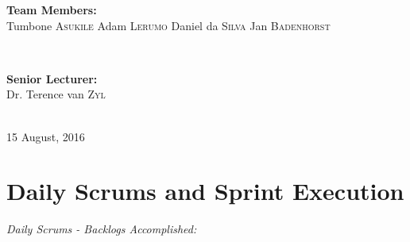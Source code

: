 \documentclass[a4paper]{article}
\begin{document}
\begin{titlepage}
\begin{minipage}{0.4\textwidth}
\begin{flushleft}
\textbf{Team Members:} \\[0.3cm]

Tumbone \textsc{Asukile} \newline
Adam \textsc{Lerumo} \newline
Daniel da \textsc{Silva} \newline
Jan \textsc{Badenhorst} \newline

\end{flushleft}

\end{minipage} \\[0.7cm]

\begin{minipage}{0.4\textwidth}

\begin{flushright} \large

\textbf{Senior Lecturer:} \\[0.3cm]

Dr. Terence van \textsc{Zyl}

\end{flushright}

\end{minipage} \\[1cm]

{\large 15 August, 2016} 
    
\end{titlepage}

\setlength\parindent{24pt}

\newpage

\section{Daily Scrums and Sprint Execution}

\emph{Daily Scrums - Backlogs Accomplished:}
\end{document}

